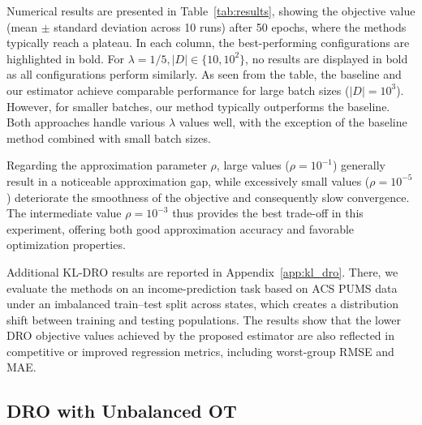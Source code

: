 \documentclass{article}
\theoremstyle{plain}
\theoremstyle{definition}
\theoremstyle{remark}
\begin{document}
Numerical results are presented in Table~\ref{tab:results}, showing the objective value (mean $\pm$ standard deviation across 10 runs) after 50 epochs, where the methods typically reach a plateau. In each column, the best-performing configurations are highlighted in bold. For $\lambda=1/5, |D| \in \{10, 10^2\}$, no results are displayed in bold as all configurations perform similarly. As seen from the table, the baseline and our estimator achieve comparable performance for large batch sizes ($|D|=10^3$). However, for smaller batches, our method typically outperforms the baseline. Both approaches handle various $\lambda$ values well, with the exception of the baseline method combined with small batch sizes.

Regarding the approximation parameter $\rho$, large values ($\rho=10^{-1}$) generally result in a noticeable approximation gap, while excessively small values ($\rho=10^{-5}$) deteriorate the smoothness of the objective and consequently slow convergence. The intermediate value $\rho=10^{-3}$ thus provides the best trade-off in this experiment, offering both good approximation accuracy and favorable optimization properties.

Additional KL-DRO results are reported in Appendix~\ref{app:kl_dro}. There, we evaluate the methods on an income-prediction task based on ACS PUMS data under an imbalanced train--test split across states, which creates a distribution shift between training and testing populations. The results show that the lower DRO objective values achieved by the proposed estimator are also reflected in competitive or improved regression metrics, including worst-group RMSE and MAE.


\subsection{DRO with Unbalanced OT} 
\end{document}
